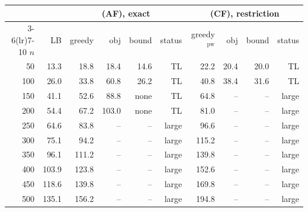 \begin{tabular}{rrrrrrrrrr}
\toprule
 & & \multicolumn{4}{c}{(AF), exact} & \multicolumn{4}{c}{(CF), restriction} \\
\cmidrule(lr){3-6}\cmidrule(lr){7-10}
$n$ & LB & greedy & obj & bound & status & greedy$^{\mathrm{pw}}$ & obj & bound & status \\
\midrule
50 & 13.3 & 18.8 & 18.4 & 14.6 & TL & 22.2 & 20.4 & 20.0 & TL \\
100 & 26.0 & 33.8 & 60.8 & 26.2 & TL & 40.8 & 38.4 & 31.6 & TL \\
150 & 41.1 & 52.6 & 88.8 & none & TL & 64.8 & -- & -- & large \\
200 & 54.4 & 67.2 & 103.0 & none & TL & 81.0 & -- & -- & large \\
250 & 64.6 & 83.8 & -- & -- & large & 96.6 & -- & -- & large \\
300 & 75.1 & 94.2 & -- & -- & large & 115.2 & -- & -- & large \\
350 & 96.1 & 111.2 & -- & -- & large & 139.8 & -- & -- & large \\
400 & 103.9 & 123.8 & -- & -- & large & 152.6 & -- & -- & large \\
450 & 118.6 & 139.8 & -- & -- & large & 169.8 & -- & -- & large \\
500 & 135.1 & 156.2 & -- & -- & large & 194.8 & -- & -- & large \\
\bottomrule
\end{tabular}
